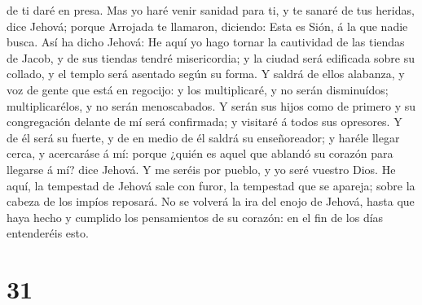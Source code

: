 de ti daré en presa.  Mas yo haré venir sanidad para ti, y
te sanaré de tus heridas, dice Jehová; porque Arrojada te llamaron,
diciendo: Esta es Sión, á la que nadie busca.  Así ha dicho
Jehová: He aquí yo hago tornar la cautividad de las tiendas de Jacob, y
de sus tiendas tendré misericordia; y la ciudad será edificada sobre su
collado, y el templo será asentado según su forma.  Y
saldrá de ellos alabanza, y voz de gente que está en regocijo: y los
multiplicaré, y no serán disminuídos; multiplicarélos, y no serán
menoscabados.  Y serán sus hijos como de primero y su
congregación delante de mí será confirmada; y visitaré á todos sus
opresores.  Y de él será su fuerte, y de en medio de él
saldrá su enseñoreador; y haréle llegar cerca, y acercaráse á mí: porque
¿quién es aquel que ablandó su corazón para llegarse á mí? dice Jehová.
 Y me seréis por pueblo, y yo seré vuestro Dios.
 He aquí, la tempestad de Jehová sale con furor, la
tempestad que se apareja; sobre la cabeza de los impíos reposará.
 No se volverá la ira del enojo de Jehová, hasta que haya
hecho y cumplido los pensamientos de su corazón: en el fin de los días
entenderéis esto.

\hypertarget{section-30}{%
\section{31}\label{section-30}}

